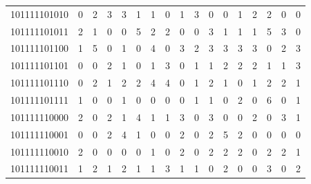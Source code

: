 \documentclass[10pt,a4paper]{article}
\begin{document}
\begin{longtable}{ |c|c|c|c|c|c|c|c|c|c|c|c|c|c|c|c|c| }
    101111101010              & 0                            & 2                                & 3                            & 3                              & 1   & 1   & 0   & 1   & 3   & 0   & 0   & 1   & 2   & 2   & 0   & 0   \\
    101111101011              & 2                            & 1                                & 0                            & 0                              & 5   & 2   & 2   & 0   & 0   & 3   & 1   & 1   & 1   & 5   & 3   & 0   \\
    101111101100              & 1                            & 5                                & 0                            & 1                              & 0   & 4   & 0   & 3   & 2   & 3   & 3   & 3   & 3   & 0   & 2   & 3   \\
    101111101101              & 0                            & 0                                & 2                            & 1                              & 0   & 1   & 3   & 0   & 1   & 1   & 2   & 2   & 2   & 1   & 1   & 3   \\
    101111101110              & 0                            & 2                                & 1                            & 2                              & 2   & 4   & 4   & 0   & 1   & 2   & 1   & 0   & 1   & 2   & 2   & 1   \\
    101111101111              & 1                            & 0                                & 0                            & 1                              & 0   & 0   & 0   & 0   & 1   & 1   & 0   & 2   & 0   & 6   & 0   & 1   \\
    101111110000              & 2                            & 0                                & 2                            & 1                              & 4   & 1   & 1   & 3   & 0   & 3   & 0   & 0   & 2   & 0   & 3   & 1   \\
    101111110001              & 0                            & 0                                & 2                            & 4                              & 1   & 0   & 0   & 2   & 0   & 2   & 5   & 2   & 0   & 0   & 0   & 0   \\
    101111110010              & 2                            & 0                                & 0                            & 0                              & 0   & 1   & 0   & 2   & 0   & 2   & 2   & 2   & 0   & 2   & 2   & 1   \\
    101111110011              & 1                            & 2                                & 1                            & 2                              & 1   & 1   & 3   & 1   & 1   & 0   & 2   & 0   & 0   & 3   & 0   & 2   \\

\end{longtable}
\end{document}

